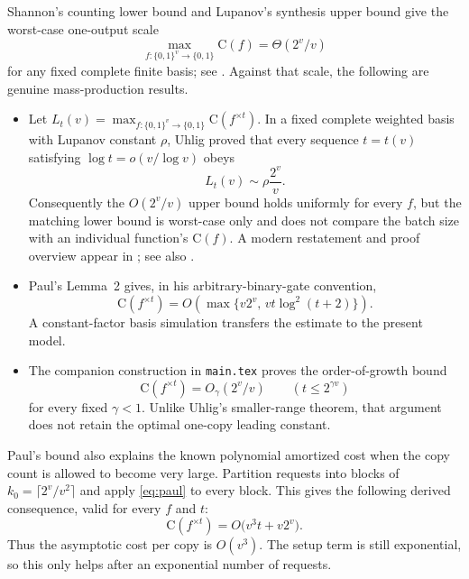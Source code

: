 \documentclass[11pt]{article}
\theoremstyle{definition}
\newcommand{\bits}{\{0,1\}}
\newcommand{\C}{\mathrm{C}}
\begin{document}
Shannon's counting lower bound and Lupanov's synthesis upper bound give the
worst-case one-output scale
\begin{equation}
  \max_{f:\bits^v\to\bits}\C(f)=\Theta(2^v/v)
  \label{eq:shannon-lupanov}
\end{equation}
for any fixed complete finite basis; see
\cite{Shannon1949,Lupanov1958,Wegener1987}.  Against that scale, the following
are genuine mass-production results.

\begin{itemize}
\item Let
$L_t(v)=\max_{f:\bits^v\to\bits}\C(f^{\times t})$.  In a fixed complete
weighted basis with Lupanov constant $\rho$, Uhlig proved that every sequence
$t=t(v)$ satisfying $\log t=o(v/\log v)$ obeys
\[
  L_t(v)\sim\rho\frac{2^v}{v}.
\]
Consequently the $O(2^v/v)$ upper bound holds uniformly for every $f$, but
the matching lower bound is worst-case only and does not compare the batch
size with an individual function's $\C(f)$.  A modern restatement and proof
overview appear in \cite{Kretschmer2023}; see also
\cite{Uhlig1974,Uhlig1992,Wegener1987}.

\item Paul's Lemma~2 \cite{Paul1976} gives, in his arbitrary-binary-gate
convention,
\begin{equation}
  \C(f^{\times t})
    =O\!\left(\max\{v2^v,\,vt\log^2(t+2)\}\right).
  \label{eq:paul}
\end{equation}
A constant-factor basis simulation transfers the estimate to the present
model.

\item The companion construction in \texttt{main.tex} proves the
order-of-growth bound
\[
  \C(f^{\times t})=O_\gamma(2^v/v)
  \qquad(t\le2^{\gamma v})
\]
for every fixed $\gamma<1$.  Unlike Uhlig's smaller-range theorem, that
argument does not retain the optimal one-copy leading constant.
\end{itemize}

Paul's bound also explains the known polynomial amortized cost when the copy
count is allowed to become very large.  Partition requests into blocks of
$k_0=\lceil2^v/v^2\rceil$ and apply \eqref{eq:paul} to every block.  This
gives the following derived consequence, valid for every $f$ and $t$:
\begin{equation}
  \C(f^{\times t})=O\bigl(v^3t+v2^v\bigr).
  \label{eq:paul-blocked}
\end{equation}
Thus the asymptotic cost per copy is $O(v^3)$.  The setup term is still
exponential, so this only helps after an exponential number of requests.
\end{document}
